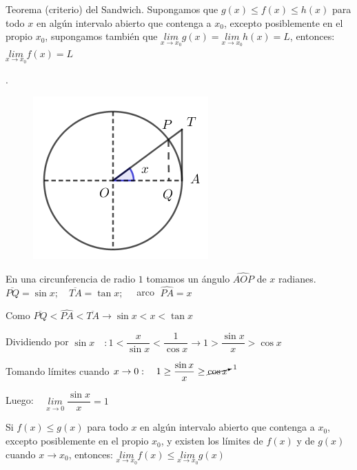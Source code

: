 	\vspace{2mm}\begin{teor} {Teorema (criterio) del Sandwich.}
	\label{teor:Sandwich}
	Supongamos que $g(x)\le f(x) \le h(x)$ para todo $x$ en algún intervalo abierto que contenga a $x_0$, excepto posiblemente en el propio $x_0$, supongamos también que $\underset {x\to x_0}{lim}{g(x)}=\underset {x\to x_0}{lim}{h(x)}=L$, entonces: $\underset {x\to x_0}{lim}{f(x)}=L$
		
	\end{teor}
	
	\begin{ejem}.
	\label{ejem:sinx/x}
		
		\begin{multicols}{2}
			\begin{figure}[H]
			\centering
			\includegraphics[width=0.4
			\textwidth]{imagenes/imagenes03/T03IM07.png}
		\end{figure}
		
		En una circunferencia de radio $1$ tomamos un ángulo $\widehat { AOP } $ de $x$ radianes. $\overline { PQ } =\sin  x; \quad \overline {TA}=\tan x; \quad $ arco $\; \widehat { PA } =x$
		
		Como $\overline {PQ}<\widehat{PA}<\overline{TA} \to \sin x < x < \tan x$
			
		Dividiendo por $\sin x \quad : 1< \dfrac {x}{\sin x}< \dfrac {1} {\cos x} \to 1> \dfrac {\sin x}{x} > \cos x$
		
		Tomando límites cuando $x\to 0: \quad 1 \ge \dfrac {\sin x}{x} \ge \cancelto {1}{\cos x} $
		
		Luego:  $\quad \underset {x\to 0}{lim}\; {\dfrac {\sin x}{x}}=1$
		\end{multicols}

		
	\end{ejem}
	
	\begin{teor}
	
	
	Si $f(x) \le g(x)$  para todo $x$ en algún intervalo abierto que contenga a $x_0$, excepto posiblemente en el propio $x_0$, y existen los límites de $f(x)$ y de $g(x)$ cuando $x\to x_0$, entonces: $\underset {x\to x_0}{lim}{f(x)} \le \underset {x\to x_0}{lim}{g(x)}$
		
	\end{teor}
	
